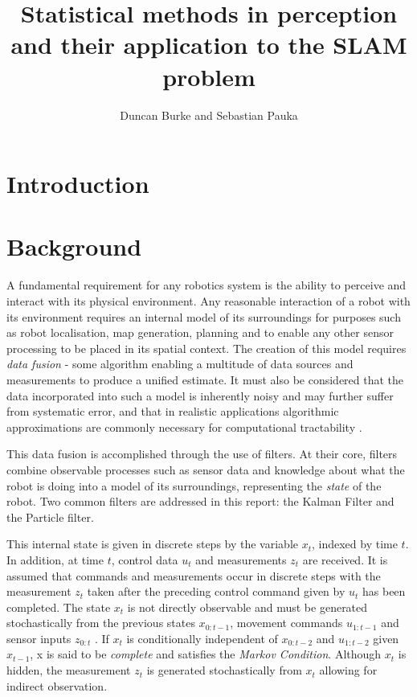 \documentclass[english]{article}
\begin{document}
\title{Statistical methods in perception and their application to the SLAM problem}

\author{Duncan Burke and Sebastian Pauka}
\maketitle


\section{Introduction}

\section{Background}

A fundamental requirement for any robotics system is the ability to perceive and interact with its physical environment. Any reasonable interaction of a robot with its environment requires an internal model of its surroundings for purposes such as robot localisation, map generation, planning and to enable any other sensor processing to be placed in its spatial context. The creation of this model requires \emph{data fusion} - some algorithm  enabling a multitude of data sources and measurements to produce a unified estimate. It must also be considered that the data incorporated into such a model is inherently noisy and may further suffer from systematic error, and that in realistic applications algorithmic approximations are commonly necessary for computational tractability \cite{probrob}.

This data fusion is accomplished through the use of filters. At their core, filters combine observable processes such as sensor data and knowledge about what the robot is doing into a model of its surroundings, representing the \emph{state} of the robot. Two common filters are addressed in this report: the Kalman Filter and the Particle filter.

This internal state is given in discrete steps by the variable $x_t$, indexed by time $t$. In addition, at time $t$, control data $u_t$ and measurements $z_t$ are received. It is assumed that commands and measurements occur in discrete steps with the measurement $z_t$ taken after the preceding control command given by $u_t$ has been completed. The state $x_t$ is not directly observable and must be generated stochastically from the previous states $x_{0:t-1}$, movement commands $u_{1:t-1}$ and sensor inputs $z_{0:t}$ \cite{Thrun02d}. If $x_t$ is conditionally independent of $x_{0:t-2}$ and $u_{1:t-2}$ given $x_{t-1}$, x is said to be \emph{complete} and satisfies the \emph{Markov Condition}\cite{probrob}. Although $x_t$ is hidden, the measurement $z_t$ is generated stochastically from $x_t$ allowing for indirect observation\cite{Thrun02d}.
\end{document}

